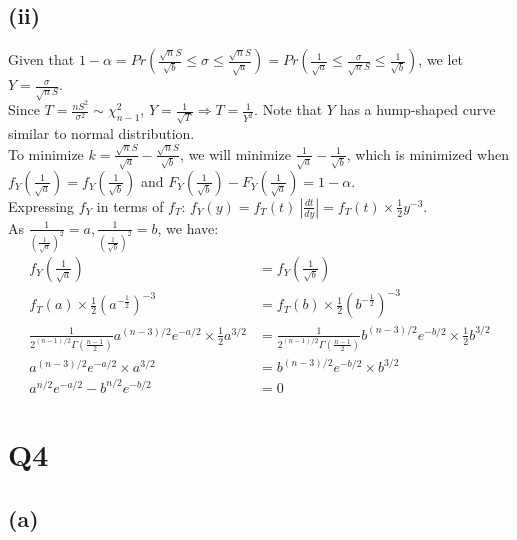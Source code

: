\documentclass{article}
\begin{document}
\subsection*{(ii)}
Given that $1 - \alpha = Pr(\frac{\sqrt{n}S}{\sqrt{b}} \leq \sigma \leq \frac{\sqrt{n}S}{\sqrt{a}}) = Pr(\frac{1}{\sqrt{a}} \leq \frac{\sigma}{\sqrt{n}S} \leq \frac{1}{\sqrt{b}})$, we let $Y = \frac{\sigma}{\sqrt{n}S}$. \\
Since $T = \frac{nS^2}{\sigma^2} \sim \chi^2_{n-1}$, $Y =\frac{1}{\sqrt{T}} \Rightarrow T = \frac{1}{Y^2}$. Note that $Y$ has a hump-shaped curve similar to normal distribution. \\
To minimize $k = \frac{\sqrt{n}S}{\sqrt{a}} - \frac{\sqrt{n}S}{\sqrt{b}}$, we will minimize $\frac{1}{\sqrt{a}} - \frac{1}{\sqrt{b}}$, which is minimized when $f_Y(\frac{1}{\sqrt{a}}) = f_Y(\frac{1}{\sqrt{b}})$ and $F_Y(\frac{1}{\sqrt{b}}) - F_Y(\frac{1}{\sqrt{a}}) = 1 - \alpha$. \\
Expressing $f_Y$ in terms of $f_T$: $f_Y(y) = f_T(t) \ | \frac{dt}{dy} | = f_T(t) \times \frac{1}{2}y^{-3}$. \\
As $\frac{1}{(\frac{1}{\sqrt{a}})^2} = a, \frac{1}{(\frac{1}{\sqrt{b}})^2} = b$, we have:
\begin{align*}
f_Y(\frac{1}{\sqrt{a}}) &= f_Y(\frac{1}{\sqrt{b}}) \\
f_T(a) \times \frac{1}{2}(a^{-\frac{1}{2}})^{-3} &= f_T(b) \times \frac{1}{2}(b^{-\frac{1}{2}})^{-3} \\
\frac{1}{2^{(n-1)/2}\Gamma(\frac{n-1}{2})}a^{(n-3)/2}e^{-a/2} \times \frac{1}{2}a^{3/2} &= \frac{1}{2^{(n-1)/2}\Gamma(\frac{n-1}{2})}b^{(n-3)/2}e^{-b/2} \times \frac{1}{2}b^{3/2} \\
a^{(n-3)/2}e^{-a/2} \times a^{3/2} &= b^{(n-3)/2}e^{-b/2} \times b^{3/2} \\
a^{n/2}e^{-a/2} - b^{n/2}e^{-b/2} &= 0
\end{align*}

\section*{Q4}

\subsection*{(a)}
\end{document}
